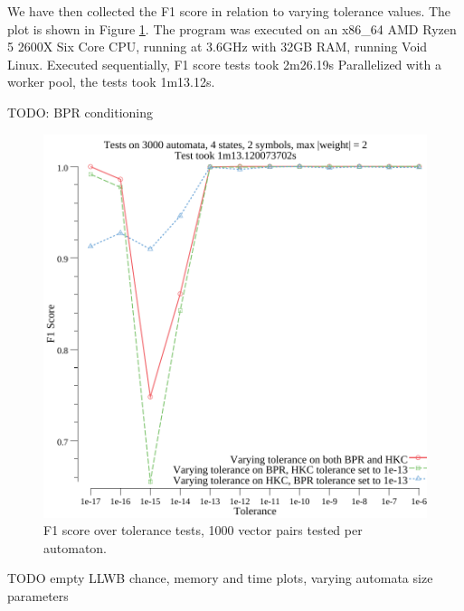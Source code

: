 We have then collected 
the F1 score in relation to varying tolerance values.
The plot is shown in Figure \ref{fig:f1}.  
The program was executed on an x86\_64 AMD Ryzen 5 2600X Six Core CPU, running at 3.6GHz with 32GB RAM, 
running Void Linux. Executed sequentially, F1 score tests took 2m26.19s
Parallelized with a worker pool, the tests took 1m13.12s.

TODO: BPR conditioning

\begin{figure}[htbp!]
    \centering
    \includegraphics[width=.8\textwidth]{./plots/f1-tol.pdf}
    
    \caption{F1 score over tolerance tests, 1000 vector pairs tested per automaton.}
    \label{fig:f1}
\end{figure}


TODO empty LLWB chance, memory and time plots, varying automata size parameters